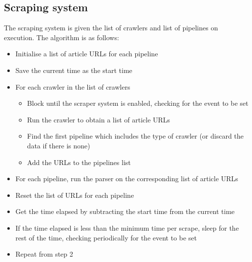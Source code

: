 \documentclass{l4proj}
\begin{document}
\subsection{Scraping system}
The scraping system is given the list of crawlers and list of pipelines on execution. The algorithm is as follows:
\begin{itemize}
    \item Initialise a list of article URLs for each pipeline
    \item Save the current time as the start time
    \item For each crawler in the list of crawlers
    \begin{itemize}
        \item Block until the scraper system is enabled, checking for the event to be set
        \item Run the crawler to obtain a list of article URLs
        \item Find the first pipeline which includes the type of crawler (or discard the data if there is none)
        \item Add the URLs to the pipelines list
    \end{itemize}
    \item For each pipeline, run the parser on the corresponding list of article URLs
    \item Reset the list of URLs for each pipeline
    \item Get the time elapsed by subtracting the start time from the current time
    \item If the time elapsed is less than the minimum time per scrape, sleep for the rest of the time, checking periodically for the event to be set
    \item Repeat from step 2
\end{itemize}
\end{document}
